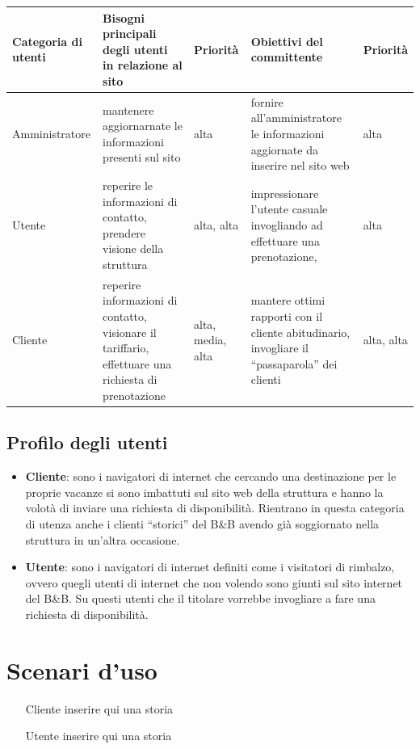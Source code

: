 \documentclass[a4paper,12pt,hidelinks]{report}
\begin{document}
\begin{center}
  \begin{tabular}{||m{3cm}||m{4cm}|m{}||m{4cm}|m{}||}
    \hline
      \textbf{Categoria di utenti} & \textbf{Bisogni principali degli utenti in relazione al sito} & Priorità & \textbf{Obiettivi del committente} & Priorità \\
    \hline
      Amministratore & mantenere aggiornarnate le informazioni presenti sul sito & alta & fornire all'amministratore le informazioni aggiornate da inserire nel sito web & alta\\
    \hline
      Utente & reperire le informazioni di contatto, prendere visione della struttura
	     & alta, alta
	     & impressionare l'utente casuale invogliando ad effettuare una prenotazione,  & alta\\
    \hline  
      Cliente & reperire informazioni di contatto, visionare il tariffario, effettuare una richiesta di prenotazione & alta, media, alta & mantere ottimi rapporti con
      il cliente abitudinario, invogliare il ``passaparola'' dei clienti & alta, alta\\
    \hline
  \end{tabular}
\end{center}
\subsection{Profilo degli utenti}
  \begin{itemize}
   \item \textbf{Cliente}: sono i navigatori di internet che cercando una destinazione per le proprie vacanze si sono imbattuti sul sito web della struttura e hanno la volotà di inviare 
   una richiesta di disponibilità. Rientrano in questa categoria di utenza anche i clienti ``storici'' del B\&B avendo già soggiornato nella struttura in un'altra occasione.
   \item \textbf{Utente}: sono i navigatori di internet definiti come i visitatori di rimbalzo, ovvero quegli utenti di internet che non volendo sono giunti sul sito internet del B\&B. 
   Su questi utenti che il titolare vorrebbe invogliare a fare una richiesta di disponibilità.
   \end{itemize}

\section{Scenari d'uso}
\par
\begin{itemize}
 \item [Cliente] inserire qui una storia
 \item [Utente] inserire qui una storia
\end{itemize}
\end{document}
